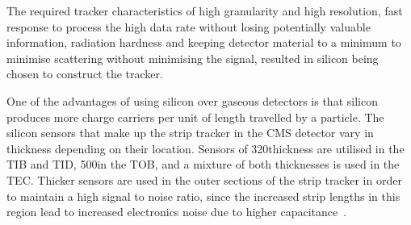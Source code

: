 




The required tracker characteristics of high granularity and high resolution, fast response to process the
high data rate without losing potentially valuable information, radiation hardness and keeping detector
material to a minimum to minimise scattering without minimising the signal, resulted in silicon being chosen
to construct the tracker.

One of the advantages of using silicon over gaseous detectors is that silicon produces more charge carriers
per unit of length travelled by a particle. The silicon sensors that make up the strip tracker in the CMS
detector vary in thickness depending on their location. Sensors of 320\um thickness are utilised in the TIB
and TID, 500\um in the TOB, and a mixture of both thicknesses is used in the TEC. Thicker sensors are used in
the outer sections of the strip tracker in order to maintain a high signal to noise ratio, since the increased
strip lengths in this region lead to increased electronics noise due to higher
capacitance~\cite{CMS_experiment}.


